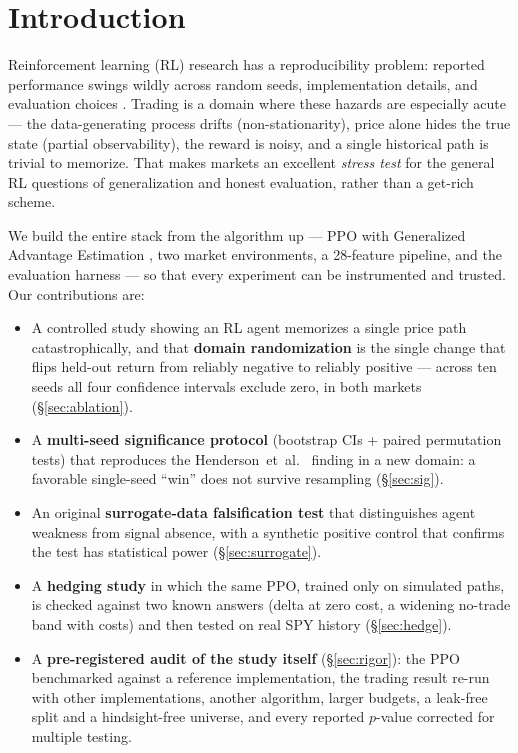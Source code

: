 \documentclass[10pt,twocolumn]{article}
\begin{document}
\section{Introduction}
Reinforcement learning (RL) research has a reproducibility problem: reported
performance swings wildly across random seeds, implementation details, and
evaluation choices \cite{henderson2018}. Trading is a domain where these hazards
are especially acute --- the data-generating process drifts (non-stationarity),
price alone hides the true state (partial observability), the reward is noisy,
and a single historical path is trivial to memorize. That makes markets an
excellent \emph{stress test} for the general RL questions of generalization and
honest evaluation, rather than a get-rich scheme.

We build the entire stack from the algorithm up --- PPO \cite{ppo} with
Generalized Advantage Estimation \cite{gae}, two market environments, a
28-feature pipeline, and the evaluation harness --- so that every experiment can
be instrumented and trusted. Our contributions are:
\begin{itemize}\itemsep2pt
  \item A controlled study showing an RL agent memorizes a single price path
  catastrophically, and that \textbf{domain randomization}
  \cite{tobin2017,cobbe2019} is the single change that flips held-out return from
  reliably negative to reliably positive --- across ten seeds all four confidence
  intervals exclude zero, in both markets (\S\ref{sec:ablation}).
  \item A \textbf{multi-seed significance protocol} (bootstrap CIs + paired
  permutation tests) that reproduces the Henderson~et~al.\ \cite{henderson2018} finding in a new
  domain: a favorable single-seed ``win'' does not survive resampling
  (\S\ref{sec:sig}).
  \item An original \textbf{surrogate-data falsification test} that distinguishes
  agent weakness from signal absence, with a synthetic positive control that
  confirms the test has statistical power (\S\ref{sec:surrogate}).
  \item A \textbf{hedging study} in which the same PPO, trained only on simulated
  paths, is checked against two known answers (delta at zero cost, a widening
  no-trade band with costs) and then tested on real SPY history
  (\S\ref{sec:hedge}).
  \item A \textbf{pre-registered audit of the study itself} (\S\ref{sec:rigor}):
  the PPO benchmarked against a reference implementation, the trading result
  re-run with other implementations, another algorithm, larger budgets, a
  leak-free split and a hindsight-free universe, and every reported $p$-value
  corrected for multiple testing.
\end{itemize}
\end{document}
